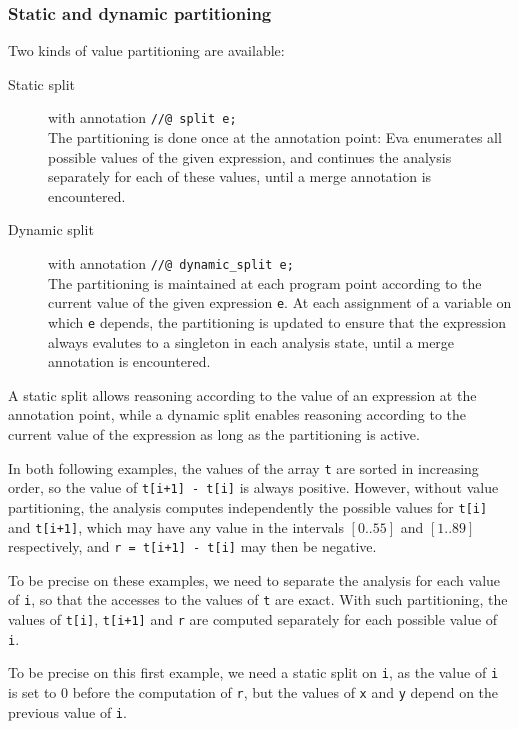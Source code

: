 \documentclass[web]{frama-c-book}
\begin{document}
\subsubsection{Static and dynamic partitioning}

Two kinds of value partitioning are available:
\begin{description}
\item[Static split] with annotation \lstinline|//@ split e;| \\
  The partitioning is done once at the annotation point: Eva enumerates all
  possible values of the given expression, and continues the analysis separately
  for each of these values, until a merge annotation is encountered.
\item[Dynamic split] with annotation \lstinline|//@ dynamic_split e;| \\
  The partitioning is maintained at each program point according to the current
  value of the given expression \lstinline|e|. At each assignment of a variable
  on which \lstinline|e| depends, the partitioning is updated to ensure that the
  expression always evalutes to a singleton in each analysis state, until a
  merge annotation is encountered.
\end{description}

A static split allows reasoning according to the value of an expression at the
annotation point, while a dynamic split enables reasoning according to the
current value of the expression as long as the partitioning is active.

In both following examples, the values of the array \lstinline|t| are sorted in
increasing order, so the value of \lstinline|t[i+1] - t[i]| is always positive.
However, without value partitioning, the analysis computes independently the
possible values for \lstinline|t[i]| and \lstinline|t[i+1]|, which may have
any value in the intervals $[0..55]$ and $[1..89]$ respectively,
and \lstinline|r = t[i+1] - t[i]| may then be negative.

To be precise on these examples, we need to separate the analysis for each value
of \lstinline|i|, so that the accesses to the values of \lstinline|t| are exact.
With such partitioning, the values of \lstinline|t[i]|, \lstinline|t[i+1]| and
\lstinline|r| are computed separately for each possible value of \lstinline|i|.



To be precise on this first example, we need a static split on \lstinline|i|, as
the value of \lstinline|i| is set to 0 before the computation of \lstinline|r|,
but the values of \lstinline|x| and \lstinline|y| depend on the previous value
of \lstinline|i|.
\end{document}
